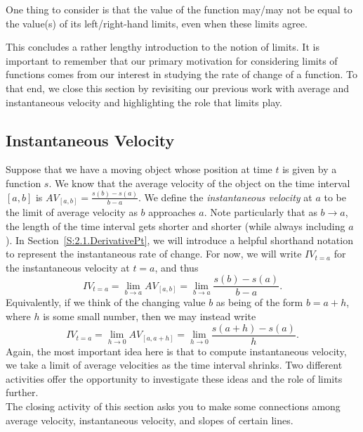 One thing to consider is that the value of the function may/may not be equal to the value(s) of its left/right-hand limits, even when these limits agree.


This concludes a rather lengthy introduction to the notion of limits.  It is important to remember that our primary motivation for considering limits of functions comes from our interest in studying the rate of change of a function.  To that end, we close this section by revisiting our previous work with average and instantaneous velocity and highlighting the role that limits play. 

\subsection*{Instantaneous Velocity}

Suppose that we have a moving object whose position at time $t$ is given by a function $s$.  We know that the average velocity of the object on the time interval $[a,b]$ is $AV_{[a,b]} = \frac{s(b)-s(a)}{b-a}.$  We define the \emph{instantaneous velocity}  at $a$ to be the limit of average velocity as $b$ approaches $a$.  Note particularly that as $b \to a$, the length of the time interval gets shorter and shorter (while always including $a$).  In Section~\ref{S:2.1.DerivativePt}, we will introduce a helpful shorthand notation to represent the instantaneous rate of change.  For now, we will write $IV_{t=a}$ for the instantaneous velocity at $t = a$, and thus
$$IV_{t=a} = \lim_{b \to a} AV_{[a,b]} = \lim_{b \to a} \frac{s(b)-s(a)}{b-a}.$$
Equivalently, if we think of the changing value $b$ as being of the form $b = a + h$, where $h$ is some small number, then we may instead write
$$IV_{t=a} = \lim_{h \to 0} AV_{[a,a+h]} = \lim_{h \to 0} \frac{s(a+h)-s(a)}{h}.$$
Again, the most important idea here is that to compute instantaneous velocity, we take a limit of average velocities as the time interval shrinks.  Two different activities offer the opportunity to investigate these ideas and the role of limits further. \\


The closing activity of this section asks you to make some connections among average velocity, instantaneous velocity, and slopes of certain lines.
\newpage

